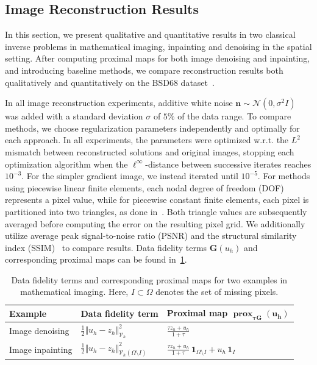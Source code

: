 \documentclass{article}
\DeclareMathOperator*{\prox}{prox}
\begin{document}
	\subsection{Image Reconstruction Results}
	In this section, we present qualitative and quantitative results in two classical inverse problems in mathematical imaging, inpainting and denoising in the spatial setting.
	After computing proximal maps for both image denoising and inpainting, and introducing baseline methods, we compare reconstruction results both qualitatively and quantitatively on the BSD68 dataset~\cite{Ma01}.
	
	In all image reconstruction experiments, additive white noise $\mathbf{n}\sim \mathcal{N}(0,\sigma^2I)$ was added with a standard deviation $\sigma$ of $5\%$ of the data range.
	To compare methods, we choose regularization parameters independently and optimally for each approach.
	In all experiments, the parameters were optimized w.r.t. the $L^2$ mismatch between reconstructed solutions and original images, stopping each optimization algorithm when the $\ell^\infty$-distance between successive iterates reaches $10^{-3}$.
	For the simpler gradient image, we instead iterated until $10^{-5}$.
	For methods using piecewise linear finite elements, each nodal degree of freedom (DOF) represents a pixel value, while for piecewise constant finite elements, each pixel is partitioned into two triangles, as done in~\cite{Ba23}.
	Both triangle values are subsequently averaged before computing the error on the resulting pixel grid.
	We additionally utilize average peak signal-to-noise ratio (PSNR) and the structural similarity index (SSIM)~\cite{Zh04} to compare results.
	Data fidelity terms $\mathbf{G}(u_h)$ and corresponding proximal maps can be found in~\cref{tab:proxmapsImaging}.
	\begin{table}
		\centering
		\renewcommand{\arraystretch}{1.45}
		\setlength{\tabcolsep}{8pt}
		\begin{tabular}{p{}|p{}|p{}}
			\centering\textbf{Example} 
			& \centering\textbf{Data fidelity term} 
			& \centering\arraybackslash\textbf{Proximal map }$\boldsymbol{\prox_{\tau \mathbf{G}}(u_h)}$ \\
			\hline
			
			Image denoising
			& $\displaystyle \frac{1}{2}\Vert u_h-z_h\Vert_{\mathcal{V}_h}^2$
			& $\displaystyle \frac{\tau z_h + u_h}{1+\tau}$ \\
			\hline
			
			Image inpainting
			& $\displaystyle \frac{1}{2}\Vert u_h-z_h\Vert^2_{\mathcal{V}_h(\Omega\setminus I)}$
			& $\displaystyle 
			\frac{\tau z_h + u_h}{1+\tau}\,\mathbf{1}_{\Omega\setminus I}
			+ u_h\,\mathbf{1}_{I}$ \\
		\end{tabular}
		\caption{Data fidelity terms and corresponding proximal maps for two examples in mathematical imaging. Here, $I\subset\Omega$ denotes the set of missing pixels.}
		\label{tab:proxmapsImaging}
	\end{table}
\end{document}
